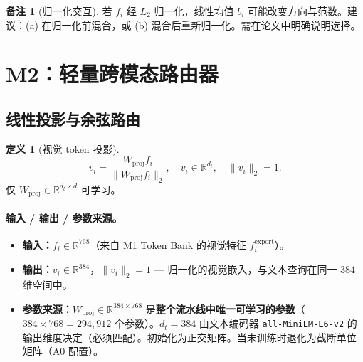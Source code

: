 \documentclass[11pt,a4paper]{article}
\newcommand{\RR}{\mathbb{R}}
\theoremstyle{definition}
\newtheorem{definition}{定义}[section]
\newtheorem{remark}{备注}[section]
\begin{document}
\begin{remark}[归一化交互]
若 $f_i$ 经 $L_2$ 归一化，线性均值 $b_i$ 可能改变方向与范数。建议：(a) 在归一化前混合，或 (b) 混合后重新归一化。需在论文中明确说明选择。
\end{remark}


\section{M2：轻量跨模态路由器}

\subsection{线性投影与余弦路由}

\begin{definition}[视觉 token 投影]
\begin{equation}\label{eq:proj}
v_i = \frac{W_{\mathrm{proj}} f_i}{\|W_{\mathrm{proj}} f_i\|_2}, \quad v_i \in \RR^{d_t}, \quad \|v_i\|_2 = 1.
\end{equation}
仅 $W_{\mathrm{proj}} \in \RR^{d_t \times d}$ 可学习。

\paragraph{输入 / 输出 / 参数来源。}
\begin{itemize}[nosep]
    \item \textbf{输入：}$f_i \in \RR^{768}$（来自 M1 Token Bank 的视觉特征 $f_i^{\mathrm{export}}$）。
    \item \textbf{输出：}$v_i \in \RR^{384}$，$\|v_i\|_2 = 1$ — 归一化的视觉嵌入，与文本查询在同一 $384$ 维空间中。
    \item \textbf{参数来源：}$W_{\mathrm{proj}} \in \RR^{384 \times 768}$ 是\textbf{整个流水线中唯一可学习的参数}（$384 \times 768 = 294{,}912$ 个参数）。$d_t = 384$ 由文本编码器 \texttt{all-MiniLM-L6-v2} 的输出维度决定（必须匹配）。初始化为正交矩阵。当未训练时退化为截断单位矩阵（A0 配置）。
\end{itemize}
\end{definition}
\end{document}
